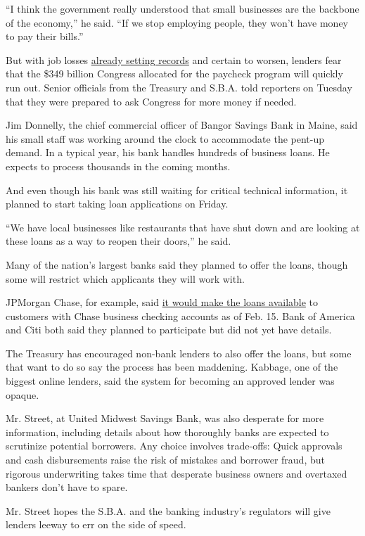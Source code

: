 ``I think the government really understood that small businesses are the
backbone of the economy,'' he said. ``If we stop employing people, they
won't have money to pay their bills.''

But with job losses
\href{https://www.nytimes.com/2020/03/26/business/economy/coronavirus-unemployment-claims.html}{already
setting records} and certain to worsen, lenders fear that the \$349
billion Congress allocated for the paycheck program will quickly run
out. Senior officials from the Treasury and S.B.A. told reporters on
Tuesday that they were prepared to ask Congress for more money if
needed.

Jim Donnelly, the chief commercial officer of Bangor Savings Bank in
Maine, said his small staff was working around the clock to accommodate
the pent-up demand. In a typical year, his bank handles hundreds of
business loans. He expects to process thousands in the coming months.

And even though his bank was still waiting for critical technical
information, it planned to start taking loan applications on Friday.

``We have local businesses like restaurants that have shut down and are
looking at these loans as a way to reopen their doors,'' he said.

Many of the nation's largest banks said they planned to offer the loans,
though some will restrict which applicants they will work with.

JPMorgan Chase, for example, said
\href{https://recovery.chase.com/cares}{it would make the loans
available} to customers with Chase business checking accounts as of Feb.
15. Bank of America and Citi both said they planned to participate but
did not yet have details.

The Treasury has encouraged non-bank lenders to also offer the loans,
but some that want to do so say the process has been maddening. Kabbage,
one of the biggest online lenders, said the system for becoming an
approved lender was opaque.

Mr. Street, at United Midwest Savings Bank, was also desperate for more
information, including details about how thoroughly banks are expected
to scrutinize potential borrowers. Any choice involves trade-offs: Quick
approvals and cash disbursements raise the risk of mistakes and borrower
fraud, but rigorous underwriting takes time that desperate business
owners and overtaxed bankers don't have to spare.

Mr. Street hopes the S.B.A. and the banking industry's regulators will
give lenders leeway to err on the side of speed.

